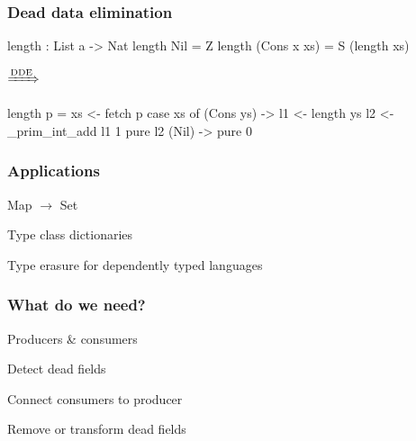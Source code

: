 \documentclass[bigger]{beamer}
\begin{document}
\begin{frame}[fragile]
\frametitle{Dead data elimination}

\begin{center}
	\begin{minipage}{0.30\textwidth}
		\begin{haskellcode}
			length : List a -> Nat
			length Nil = Z
			length (Cons x xs) 
			  = S (length xs)
		\end{haskellcode}
	\end{minipage}
	\hspace{1cm}
	$\xRightarrow{\text{DDE}}$
	\hfill
	\begin{minipage}{0.5\textwidth}
		\begin{haskellcode}
			length p =
			 xs <- fetch p
			 case xs of
			  (Cons ys) ->
			   l1 <- length ys
			   l2 <- _prim_int_add l1 1
			   pure l2
			  (Nil) ->
			    pure 0
		\end{haskellcode}
	\end{minipage}
\end{center}


\end{frame}

\begin{frame}
\frametitle{Applications}

	\begin{vfitemize}
		\item Map $\rightarrow$ Set
		\item Type class dictionaries
		\item Type erasure for dependently typed languages
	\end{vfitemize}

\end{frame} 

\begin{frame}
\frametitle{What do we need?}

	\begin{vfitemize}
		\item Producers \& consumers
		\item Detect dead fields
		\item Connect consumers to producer
		\item Remove or transform dead fields
	\end{vfitemize}

\end{frame}
\end{document}
